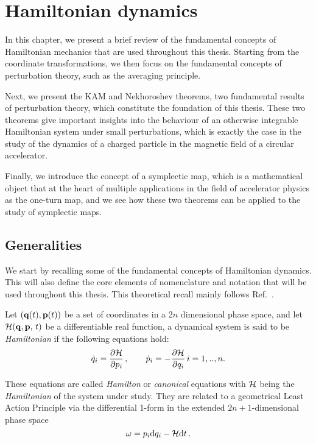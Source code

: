 
\chapter{Hamiltonian dynamics}\label{ch:mathematical_elements}

In this chapter, we present a brief review of the fundamental concepts of Hamiltonian mechanics that are used throughout this thesis. Starting from the coordinate transformations, we then focus on the fundamental concepts of perturbation theory, such as the averaging principle.

Next, we present the KAM and Nekhoroshev theorems, two fundamental results of perturbation theory, which constitute the foundation of this thesis. These two theorems give important insights into the behaviour of an otherwise integrable Hamiltonian system under small perturbations, which is exactly the case in the study of the dynamics of a charged particle in the magnetic field of a circular accelerator.

Finally, we introduce the concept of a symplectic map, which is a mathematical object that at the heart of multiple applications in the field of accelerator physics as the one-turn map, and we see how these two theorems can be applied to the study of symplectic maps.

\section{Generalities}\label{sec:1:hamiltonian}

We start by recalling some of the fundamental concepts of Hamiltonian dynamics. This will also define the core elements of nomenclature and notation that will be used throughout this thesis. This theoretical recall mainly follows Ref.~\cite{Arnold:937549}.

Let $(\vb{q}(t),\vb{p}(t))$ be a set of coordinates in a 2$n$ dimensional phase space, and let $\mathcal{H}(\vb{q},\vb{p},\, t)$ be a differentiable real function, a dynamical system is said to be \textit{Hamiltonian} if the following equations hold:
%
\begin{equation} 
	\dot q_i = \pdv{\mathcal{H}}{p_i}
		\,,\qquad 		\dot p_i = -\pdv{\mathcal{H}}{q_i} \, i=1,..,n.
	\label{hameq}
 \end{equation} 

These equations are called \textit{Hamilton} or \textit{canonical} equations with $\mathcal{H}$ being the \textit{Hamiltonian} of the system under study. They are related to a geometrical Least Action Principle via the differential 1-form in the extended $2n+1$-dimensional phase space 
%
\begin{equation} \omega = p_i \dd q_i -\mathcal{H} \dd t \, .  
\end{equation}

